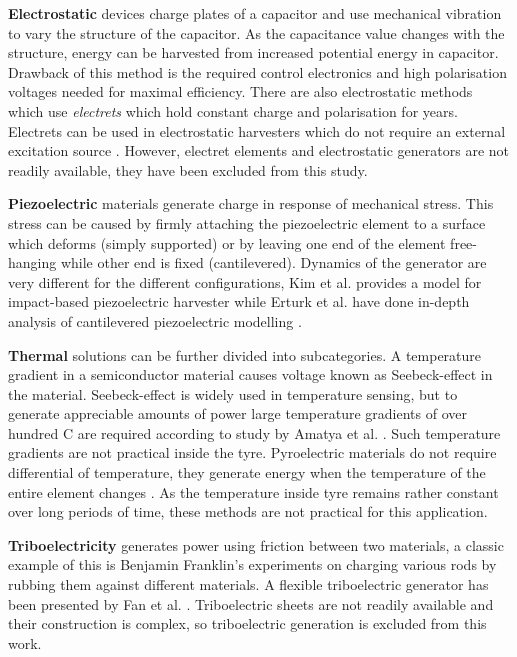\textbf{Electrostatic} devices charge plates of a capacitor and use mechanical vibration to vary the structure of the capacitor. As the capacitance value changes with the structure, energy can be harvested from increased potential energy in capacitor. Drawback of this method is the required control electronics and high polarisation voltages needed for maximal efficiency. There are also electrostatic methods which use \textit{electrets} which hold constant charge and polarisation for years. Electrets can be used in electrostatic harvesters which do not require an external excitation source \cite{Boisseau2012}. However, electret elements and electrostatic generators are not readily available, they have been excluded from this study.

\textbf{Piezoelectric} materials generate charge in response of mechanical stress. This stress can be caused by firmly attaching the piezoelectric element to a surface which deforms (simply supported) or by leaving one end of the element free-hanging while other end is fixed (cantilevered). Dynamics of the generator are very different for the different configurations, Kim et al. \cite{Kim2014a} provides a model for impact-based piezoelectric harvester while Erturk et al. have done in-depth analysis of cantilevered piezoelectric modelling \cite{Erturk2009}. 

\textbf{Thermal} solutions can be further divided into subcategories. A temperature gradient in a semiconductor material causes voltage known as Seebeck-effect in the material. Seebeck-effect is widely used in temperature sensing, but to generate appreciable amounts of power large temperature gradients of over hundred \degree C are required according to study by Amatya et al. \cite{Amatya2010}. Such temperature gradients are not practical inside the tyre. Pyroelectric materials do not require differential of temperature, they generate energy when the temperature of the entire element changes \cite{Zhang2011}. As the temperature inside tyre remains rather constant over long periods of time, these methods are not practical for this application.

\textbf{Triboelectricity} generates power using friction between two materials, a classic example of this is Benjamin Franklin's experiments on charging various rods by rubbing them against different materials. A flexible triboelectric generator has been presented by Fan et al. \cite{Fan2012}. Triboelectric sheets are not readily available and their construction is complex, so triboelectric generation is excluded from this work. 

